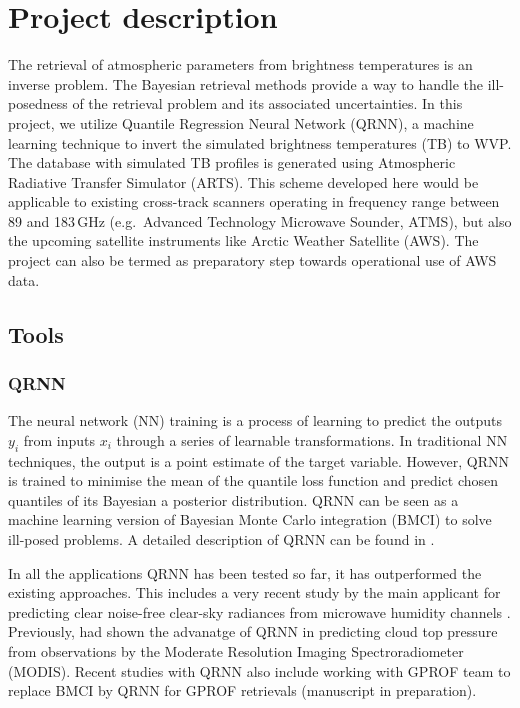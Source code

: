 \documentclass[12pt,oneside,a4paper]{article}
\begin{document}
\section{Project description}

The retrieval of atmospheric parameters from brightness temperatures is an inverse problem. The Bayesian retrieval methods provide a way to handle the ill-posedness of the retrieval problem and its associated uncertainties. In this project, we utilize  Quantile Regression Neural Network (QRNN), a machine learning technique to invert the simulated brightness temperatures (TB) to WVP. The database with simulated TB profiles is generated using Atmospheric Radiative Transfer Simulator (ARTS). This scheme developed here would be applicable to existing cross-track scanners operating in frequency range between 89 and 183\,GHz (e.g.\, Advanced Technology Microwave Sounder, ATMS), but also the upcoming satellite instruments like Arctic Weather Satellite (AWS). The project can also be termed as preparatory step towards operational use of AWS data.
 
\subsection{Tools}
\subsubsection{QRNN}
%
\label{sec:qrnn}
The neural network (NN) training is a process of learning to predict the outputs {$y_i$} from inputs {$x_i$} through a series of learnable transformations. In traditional NN techniques, the output is a point estimate of the target variable. However, QRNN is trained to minimise the mean of the quantile loss function and predict chosen quantiles of its Bayesian a posterior distribution. QRNN can be seen as a machine learning version of Bayesian Monte Carlo integration (BMCI) to solve ill-posed problems. A detailed description of QRNN can be found in \citet{pfreundschuh:aneur:18}.  

In all the applications QRNN has been tested so far, it has outperformed the existing approaches. This includes a very recent study by the main applicant for predicting clear noise-free clear-sky radiances from microwave humidity channels \citep{kaur:2021:canma}. Previously, \citet{pfreundschuh:aneur:18} had shown the advanatge of QRNN in predicting cloud top pressure from observations by the Moderate Resolution Imaging Spectroradiometer (MODIS). Recent studies with QRNN also include working with GPROF team  to replace BMCI by QRNN for GPROF retrievals (manuscript in preparation).
\end{document}
